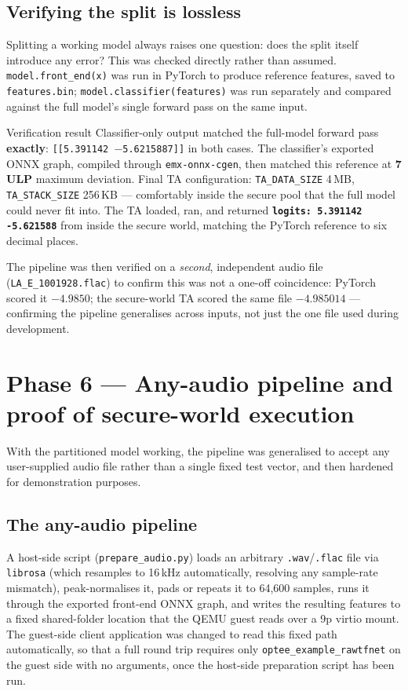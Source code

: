 \documentclass[11pt,a4paper]{report}
\newcommand{\code}[1]{\texttt{\small #1}}
\begin{document}
\subsection{Verifying the split is lossless}

Splitting a working model always raises one question: does the split itself introduce any error?
This was checked directly rather than assumed. \code{model.front\_end(x)} was run in PyTorch to
produce reference features, saved to \code{features.bin}; \code{model.classifier(features)} was run
separately and compared against the full model's single forward pass on the same input.

\begin{resolvedbox}{Verification result}
Classifier-only output matched the full-model forward pass \textbf{exactly}: \code{[[5.391142
$-$5.6215887]]} in both cases. The classifier's exported ONNX graph, compiled through
\code{emx-onnx-cgen}, then matched this reference at \textbf{7 ULP} maximum deviation. Final TA
configuration: \code{TA\_DATA\_SIZE} 4\,MB, \code{TA\_STACK\_SIZE} 256\,KB --- comfortably inside
the secure pool that the full model could never fit into. The TA loaded, ran, and returned
\textbf{\code{logits: 5.391142 -5.621588}} from inside the secure world, matching the PyTorch
reference to six decimal places.
\end{resolvedbox}

The pipeline was then verified on a \emph{second}, independent audio file
(\code{LA\_E\_1001928.flac}) to confirm this was not a one-off coincidence: PyTorch scored it
$-4.9850$; the secure-world TA scored the same file $-4.985014$ --- confirming the pipeline
generalises across inputs, not just the one file used during development.

\section{Phase 6 --- Any-audio pipeline and proof of secure-world execution}

With the partitioned model working, the pipeline was generalised to accept any user-supplied audio
file rather than a single fixed test vector, and then hardened for demonstration purposes.

\subsection{The any-audio pipeline}

A host-side script (\code{prepare\_audio.py}) loads an arbitrary \code{.wav}/\code{.flac} file via
\code{librosa} (which resamples to 16\,kHz automatically, resolving any sample-rate mismatch),
peak-normalises it, pads or repeats it to 64,600 samples, runs it through the exported front-end
ONNX graph, and writes the resulting features to a fixed shared-folder location that the QEMU guest
reads over a 9p virtio mount. The guest-side client application was changed to read this fixed path
automatically, so that a full round trip requires only \code{optee\_example\_rawtfnet} on the guest
side with no arguments, once the host-side preparation script has been run.
\end{document}
